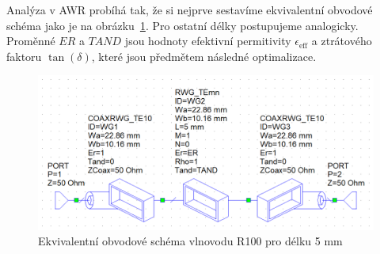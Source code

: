 \documentclass[11pt,a4paper]{article}
\begin{document}
Analýza v AWR probíhá tak, že si nejprve sestavíme ekvivalentní obvodové schéma jako je na obrázku~\ref{fig:r100-schematic}. Pro ostatní délky postupujeme analogicky. Proměnné $\mathit{ER}$ a $\mathit{TAND}$ jsou hodnoty efektivní permitivity $\epsilon_{\mathrm{eff}}$ a ztrátového faktoru $\tan(\delta)$, které jsou předmětem následné optimalizace.
\begin{figure}[!ht]
    \centering
    \includegraphics[width=.7\textwidth]{src/r100-schematic.png}
    \caption{\label{fig:r100-schematic}Ekvivalentní obvodové schéma vlnovodu R100 pro délku 5 mm}
\end{figure}
\end{document}

